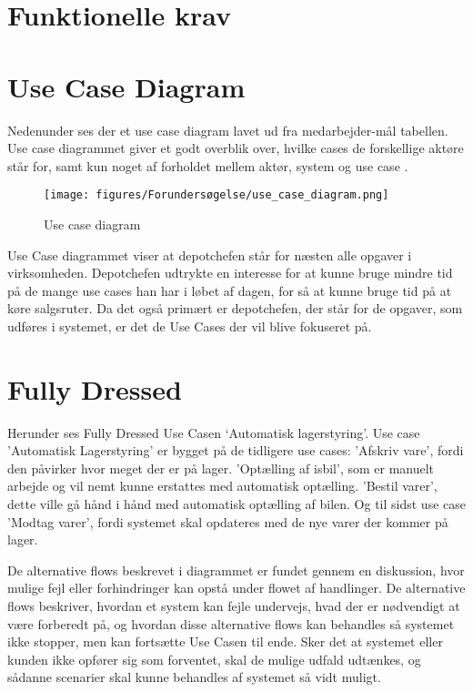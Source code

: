 \section{Funktionelle krav}\label{sec:funktionelle-krav}

\section{Use Case Diagram}
Nedenunder ses der et use case diagram lavet ud fra medarbejder-mål tabellen. Use case diagrammet giver et godt overblik over, hvilke cases de forskellige aktøre står for, samt kun noget af forholdet mellem aktør, system og use case \cite{visual-paradigm.com}. 

\begin{figure}[H]
    \centering
    \texttt{[image: figures/Forundersøgelse/use\_case\_diagram.png]}
    \caption{Use case diagram}
    \label{fig:use_case_diagram}
\end{figure}

Use Case diagrammet viser at depotchefen står for næsten alle opgaver i virksomheden. Depotchefen udtrykte en interesse for at kunne bruge mindre tid på de mange use cases han har i løbet af dagen, for så at kunne bruge tid på at køre salgsruter. Da det også primært er depotchefen, der står for de opgaver, som udføres i systemet, er det de Use Cases der vil blive fokuseret på.

\section{Fully Dressed}

Herunder ses Fully Dressed Use Casen ‘Automatisk lagerstyring’. Use case 'Automatisk Lagerstyring' er bygget på de tidligere use cases: 'Afskriv vare', fordi den påvirker hvor meget der er på lager. 'Optælling af isbil', som er manuelt arbejde og vil nemt kunne erstattes med automatisk optælling. 'Bestil varer', dette ville gå hånd i hånd med automatisk optælling af bilen. Og til sidst use case 'Modtag varer', fordi systemet skal opdateres med de nye varer der kommer på lager. 

De alternative flows beskrevet i diagrammet er fundet gennem en diskussion, hvor mulige fejl eller forhindringer kan opstå under flowet af handlinger. De alternative flows beskriver, hvordan et system kan fejle undervejs, hvad der er nødvendigt at være forberedt på, og hvordan disse alternative flows kan behandles så systemet ikke stopper, men kan fortsætte Use Casen til ende. Sker det at systemet eller kunden ikke opfører sig som forventet, skal de mulige udfald udtænkes, og sådanne scenarier skal kunne behandles af systemet så vidt muligt.


